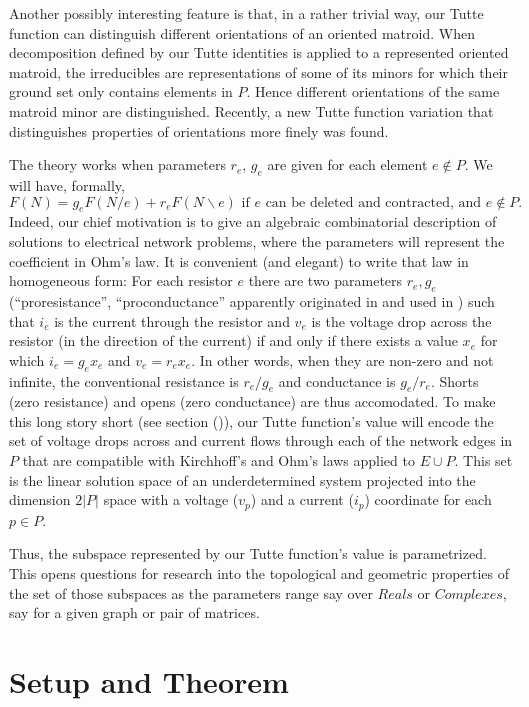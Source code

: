 \documentclass[Unicode]{cedram-alco}
\begin{document}
Another possibly interesting feature is that, in a rather trivial way,
our Tutte function can distinguish different orientations of an oriented
matroid.  When decomposition defined by our Tutte identities is applied to
a represented oriented matroid, the irreducibles are representations of
some of its minors for which their ground set only contains elements in $P$.   Hence different
orientations of the same matroid minor are distinguished.  Recently,
a new Tutte function variation that distinguishes properties of orientations
more finely was found\cite{AwanBernardiOMTuttePre}.


The theory works when parameters $r_e$, $g_e$ are given for each element $e\not\in P$. We
will have, formally,
\[
   F(N) = g_eF(N/e)+r_eF(N\backslash e) \text{ if\ }e\text{ can be deleted and contracted, and }e\not\in P.
   \]
Indeed, our chief motivation is to give an algebraic combinatorial description of solutions
to electrical network problems, where the parameters will represent the coefficient
in Ohm's law.  It is convenient (and elegant) to write that law in homogeneous form:
For each resistor $e$ there
are two parameters $r_e,g_e$
(``proresistance'', ``proconductance'' apparently originated in \cite{SmithElec} and  used in
\cite{TutteEx,CirThProjHomo2019}) such that $i_e$ is the current through the resistor and $v_e$ is
the voltage drop across the resistor (in the direction of the current) if and only if there
exists a value $x_e$ for which $i_e=g_ex_e$ and $v_e=r_ex_e$.  In other words, when they
are non-zero and not infinite, the conventional
resistance is $r_e/g_e$ and conductance is $g_e/r_e$. Shorts (zero resistance) and opens (zero
conductance) are thus accomodated.   To make this long story short (see section ()),
our Tutte function's value
will encode the set of voltage drops across and current flows through each of
the network edges in $P$ that are compatible with Kirchhoff's and Ohm's laws applied to $E\cup P$. This set
is the linear solution space of an underdetermined system projected into the
dimension $2|P|$ space with a voltage ($v_{p}$) and a current ($i_{p}$) coordinate for each $p\in P$.

Thus, the subspace represented by our Tutte function's value is parametrized.  This opens
questions for research into the topological and geometric properties of the set of those subspaces
as the parameters range say over $Reals$ or $Complexes$, say for a given graph or pair of
matrices.



\section{Setup and Theorem}
\end{document}
